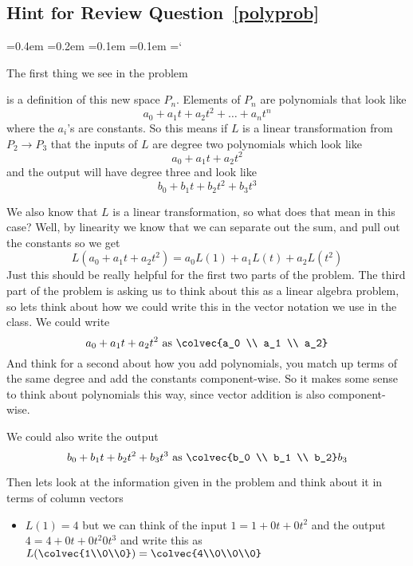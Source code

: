 
\subsection*{Hint for Review Question~\ref{polyprob}}

{\ttfamily
{}\font=0.4em
\font=0.2em
\font=0.1em
\font=0.1em
\hyphenchar\font=`\-

\hypertarget{scripts_linear_transformations_hint}{The first thing we see in the problem} is a definition of this new space $P_n$. Elements of $P_n$ are polynomials that look like \[a_0 + a_1 t +a_2 t^2 + \ldots + a_n t^n\] where the $a_i$'s are constants. So this means if $L$ is a linear transformation from $P_2 \to P_3$ that the inputs of $L$ are degree two polynomials which look like \[a_0 + a_1 t +a_2 t^2\]
and the output will have degree three and look like \[b_0 + b_1 t +b_2 t^2 + b_3 t^3\]

We also know that $L$ is a linear transformation, so what does that mean in this case? Well, by linearity we know that we can separate out the sum, and pull out the constants so we get
\[ L (a_0 + a_1 t +a_2 t^2) = a_0L(1) + a_1L( t) +a_2 L( t^2)\]
Just this should be really helpful for the first two parts of the problem. The third part of the problem is asking us to think about this as a linear algebra problem, so lets think about how we could write this in the vector notation we use in the class. We could write 
\[a_0 + a_1 t +a_2 t^2 \text{ as } \colvec{a_0 \\ a_1 \\ a_2} \]
And think for a second about how you add polynomials, you match up terms of the same degree and add the constants component-wise. So it makes some sense to think about polynomials this way, since vector addition is also component-wise.

We could also write the output 
\[  b_0 + b_1 t +b_2 t^2 + b_3 t^3 \text{ as }  \colvec{b_0 \\ b_1 \\ b_2} \\ b_3\]

Then lets look at the information given in the problem and think about it in terms of column vectors 
\begin{itemize}
\item $L(1) = 4$ but we can think of the input $1= 1+ 0t + 0t^2 $ and the output  $4 = 4+ 0t + 0t^2 0t^3$ and write this as $ L (\colvec{1\\0\\0}) = \colvec{4\\0\\0\\0}$


\end{itemize}}
